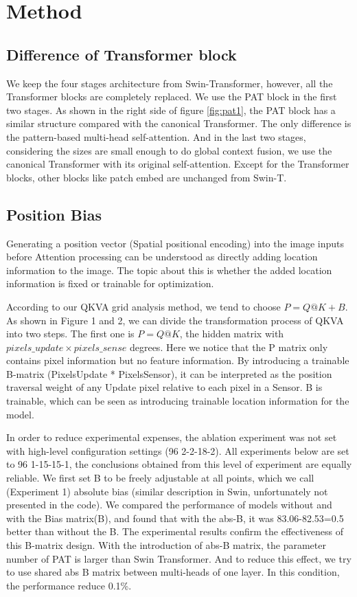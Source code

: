 \documentclass{article}
\theoremstyle{plain}
\theoremstyle{definition}
\theoremstyle{remark}
\begin{document}
\section{Method}
\subsection{Difference of Transformer block}
We keep the four stages architecture from Swin-Transformer, however, all the Transformer blocks are completely replaced. We use the PAT block in the first two stages. As shown in the right side of figure \ref{fig:pat1}, the PAT block has a similar structure compared with the canonical Transformer. The only difference is the pattern-based multi-head self-attention. And in the last two stages, considering the sizes are small enough to do global context fusion, we use the canonical Transformer with its original self-attention. Except for the Transformer blocks, other blocks like patch embed are unchanged from Swin-T.

\subsection{Position Bias}
Generating a position vector (Spatial positional encoding) into the image inputs before Attention processing can be understood as directly adding location information to the image. The topic about this is whether the added location information is fixed or trainable for optimization.

According to our QKVA grid analysis method, we tend to choose $P= Q@K + B$. As shown in Figure 1 and 2, we can divide the transformation process of QKVA into two steps. The first one is $P= Q@K$, the hidden matrix with $pixels\_update \times pixels\_sense$ degrees. Here we notice that the P matrix only contains pixel information but no feature information. By introducing a trainable B-matrix (PixelsUpdate * PixelsSensor), it can be interpreted as the position traversal weight of any Update pixel relative to each pixel in a Sensor. B is trainable, which can be seen as introducing trainable location information for the model. 

In order to reduce experimental expenses, the ablation experiment was not set with high-level configuration settings (96 2-2-18-2). All experiments below are set to 96 1-15-15-1, the conclusions obtained from this level of experiment are equally reliable.
We first set B to be freely adjustable at all points, which we call (Experiment 1) absolute bias (similar description in Swin, unfortunately not presented in the code). We compared the performance of models without and with the Bias matrix(B), and found that with the abs-B, it was 83.06-82.53=0.5 better than without the B. The experimental results confirm the effectiveness of this B-matrix design. With the introduction of abs-B matrix, the parameter number of PAT is larger than Swin Transformer. And to reduce this effect, we try to use shared abs B matrix between multi-heads of one layer. In this condition, the performance reduce 0.1\%.
\end{document}
